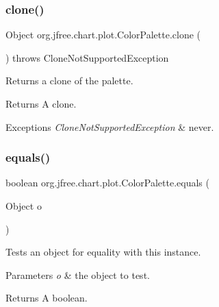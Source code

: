 \subsubsection{\texorpdfstring{clone()}{clone()}}
{\footnotesize\ttfamily Object org.\+jfree.\+chart.\+plot.\+Color\+Palette.\+clone (\begin{DoxyParamCaption}{ }\end{DoxyParamCaption}) throws Clone\+Not\+Supported\+Exception}

Returns a clone of the palette.

\begin{DoxyReturn}{Returns}
A clone.
\end{DoxyReturn}

\begin{DoxyExceptions}{Exceptions}
{\em Clone\+Not\+Supported\+Exception} & never. \\
\hline
\end{DoxyExceptions}
\mbox{\label{classorg_1_1jfree_1_1chart_1_1plot_1_1_color_palette_a5fdca08a4c599b4ed52e4d5c9cb3eafc}} 
\subsubsection{\texorpdfstring{equals()}{equals()}}
{\footnotesize\ttfamily boolean org.\+jfree.\+chart.\+plot.\+Color\+Palette.\+equals (\begin{DoxyParamCaption}\item[{Object}]{o }\end{DoxyParamCaption})}

Tests an object for equality with this instance.


\begin{DoxyParams}{Parameters}
{\em o} & the object to test.\\
\hline
\end{DoxyParams}
\begin{DoxyReturn}{Returns}
A boolean. 
\end{DoxyReturn}
\mbox{\label{classorg_1_1jfree_1_1chart_1_1plot_1_1_color_palette_a9e5b5b2da2058672c706f55039f8cd2d}} 
